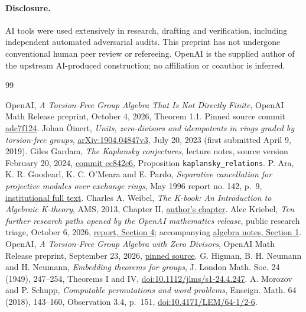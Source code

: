 \documentclass[11pt]{article}
\begin{document}
\paragraph{Disclosure.}
AI tools were used extensively in research, drafting and verification,
including independent automated adversarial audits. This preprint has
not undergone conventional human peer review or refereeing. OpenAI is
the supplied author of the upstream AI-produced construction; no
affiliation or coauthor is inferred.

\begin{thebibliography}{99}
\raggedright
{} OpenAI, \emph{A Torsion-Free Group Algebra That Is Not
Directly Finite}, OpenAI Math Release preprint, October 4, 2026,
Theorem 1.1. Pinned source commit
\href{https://github.com/openai/math/tree/adc7f1241b42e322a6451854ab7e4b4c146bf78a/preprints/A-Torsion-Free-Group-Algebra-That-Is-Not-Directly-Finite-October-4-2026}{adc7f124}.
 Johan {\"O}inert, \emph{Units, zero-divisors and idempotents
in rings graded by torsion-free groups},
\href{https://arxiv.org/abs/1904.04847v3}{arXiv:1904.04847v3}, July 20, 2023
(first submitted April 9, 2019).
 Giles Gardam, \emph{The Kaplansky conjectures}, lecture
notes, source version February 20, 2024,
\href{https://github.com/gilesgardam/lectures/blob/ec842e6a09851e98a38e2a4bea3b273b4a9debb9/kaplansky.tex}{commit ec842e6}, Proposition
\texttt{kaplansky\_relations}.
 P. Ara, K. R. Goodearl, K. C. O'Meara and E. Pardo,
\emph{Separative cancellation for projective modules over exchange rings},
May 1996 report no. 142, p.~9,
\href{https://ir.canterbury.ac.nz/bitstreams/9810640d-0c02-42b1-a9ac-49f0f8bd703b/download}{institutional full text}.
 Charles A. Weibel, \emph{The K-book: An Introduction to
Algebraic K-theory}, AMS, 2013, Chapter II,
\href{https://sites.math.rutgers.edu/~weibel/Kbook/Kbook.ii.pdf}{author's chapter}.
 Alec Kriebel, \emph{Ten further research paths opened by
the OpenAI mathematics release}, public research triage, October 6, 2026,
\href{https://github.com/AlecKriebel/Math/blob/f27318d83bd7000ef817957a9a4b3087de28d198/openai_followon_batch2_20261006/REPORT.md}{report, Section 4}; accompanying
\href{https://github.com/AlecKriebel/Math/blob/f27318d83bd7000ef817957a9a4b3087de28d198/openai_followon_batch2_20261006/agent_notes/algebra_groups.md}{algebra notes, Section 1}.
 OpenAI, \emph{A Torsion-Free Group Algebra with Zero
Divisors}, OpenAI Math Release preprint, September 23, 2026,
\href{https://github.com/openai/math/tree/adc7f1241b42e322a6451854ab7e4b4c146bf78a/preprints/A-Torsion-Free-Group-Algebra-with-Zero-Divisors-September-23-2026}{pinned source}.
 G. Higman, B. H. Neumann and H. Neumann,
\emph{Embedding theorems for groups}, J. London Math. Soc. 24 (1949),
247--254, Theorems I and IV,
\href{https://doi.org/10.1112/jlms/s1-24.4.247}{doi:10.1112/jlms/s1-24.4.247}.
 A. Morozov and P. Schupp, \emph{Computable permutations
and word problems}, Enseign. Math. 64 (2018), 143--160,
Observation 3.4, p.~151,
\href{https://doi.org/10.4171/LEM/64-1/2-6}{doi:10.4171/LEM/64-1/2-6}.
\end{thebibliography}
\end{document}
